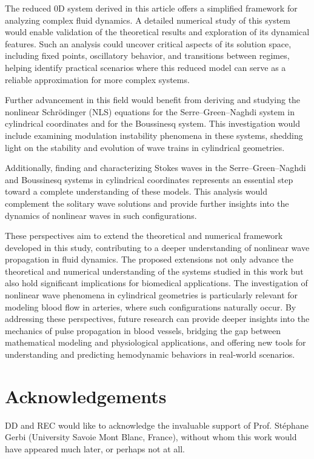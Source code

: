 \documentclass[alpha-refs, 12pt]{wiley-article}
\begin{document}
The reduced 0D system derived in this article offers a simplified framework for analyzing complex fluid dynamics. A detailed numerical study of this system would enable validation of the theoretical results and exploration of its dynamical features. Such an analysis could uncover critical aspects of its solution space, including fixed points, oscillatory behavior, and transitions between regimes, helping identify practical scenarios where this reduced model can serve as a reliable approximation for more complex systems.

Further advancement in this field would benefit from deriving and studying the nonlinear Schr\"odinger (NLS) equations for the Serre--Green--Naghdi system in cylindrical coordinates and for the Boussinesq system. This investigation would include examining modulation instability phenomena in these systems, shedding light on the stability and evolution of wave trains in cylindrical geometries.

Additionally, finding and characterizing Stokes waves in the Serre--Green--Naghdi and Boussinesq systems in cylindrical coordinates represents an essential step toward a complete understanding of these models. This analysis would complement the solitary wave solutions and provide further insights into the dynamics of nonlinear waves in such configurations.

These perspectives aim to extend the theoretical and numerical framework developed in this study, contributing to a deeper understanding of nonlinear wave propagation in fluid dynamics. The proposed extensions not only advance the theoretical and numerical understanding of the systems studied in this work but also hold significant implications for biomedical applications. The investigation of nonlinear wave phenomena in cylindrical geometries is particularly relevant for modeling blood flow in arteries, where such configurations naturally occur. By addressing these perspectives, future research can provide deeper insights into the mechanics of pulse propagation in blood vessels, bridging the gap between mathematical modeling and physiological applications, and offering new tools for understanding and predicting hemodynamic behaviors in real-world scenarios.

\vspace*{1.5em}
\section*{Acknowledgements}

DD and REC would like to acknowledge the invaluable support of Prof. St\'ephane Gerbi (University Savoie Mont Blanc, France), without whom this work would have appeared much later, or perhaps not at all.
\end{document}
